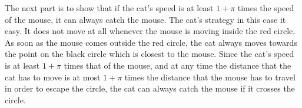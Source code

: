 \begin{solution}
The next part is to show that if the cat's speed is at least $1+\pi$ times the speed of the mouse, it can always catch the mouse. The cat's strategy in this case it easy. It does not move at all whenever the mouse is moving inside the red circle. As soon as the mouse comes outside the red circle, the cat always moves towards the point on the black circle which is closest to the mouse. Since the cat's speed is at least $1+\pi$ times that of the mouse, and at any time the distance that the cat has to move is at most $1+\pi$ times the distance that the mouse has to travel in order to escape the circle, the cat can always catch the mouse if it crosses the circle.
\end{solution}

